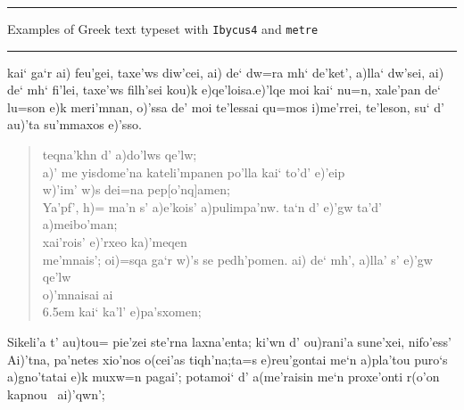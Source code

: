 \documentclass[11pt]{report}
\begin{document}
\vspace{2ex}
\hrule height 1.5pt \vspace{2ex}
{\large Examples of Greek text typeset with \texttt{Ibycus4} and %
  \texttt{metre}}
\vspace{2ex}
\hrule height 1.5pt
\vspace{7ex}
\selectfont
{\obeylines\everypar{\quad}
kai` ga`r ai) feu'gei, taxe'ws diw'cei,
ai) de` dw=ra mh` de'ket', a)lla` dw'sei,
ai) de` mh` fi'lei, taxe'ws filh'sei
kou)k e)qe'loisa.\linea* 
e)'lqe moi kai` nu=n, xale'pan de` lu=son
e)k meri'mnan, o)'ssa de' moi te'lessai
qu=mos i)me'rrei, te'leson, su` d' au)'ta
su'mmaxos e)'sso.\geminata*
}
\vspace{5ex}
\begin{verse}
teqna'khn d' a)do'lws qe'lw;\\
a)' me yisdome'na kateli'mpanen\linea
po'lla kai` to'd' e)'eip\punctum\lbrack\\
w)'im' w)s dei=na pep[o'nq]amen;\\
Ya'pf', h)= ma'n s' a)e'kois' a)pulimpa'nw.\linea
ta`n d' e)'gw ta'd' a)meibo'man;\\
xai'rois' e)'rxeo ka)'meqen\\
me'mnais'; oi)=sqa ga`r w)'s se pedh'pomen.\linea
ai) de` mh', a)lla' s' e)'gw qe'lw\\
o)'mnaisai\lbrack\punctum[3]\Punctum\rbrack%
 \lbrack\punctum[2]\Punctum\rbrack\punctum[2]ai\\
 \punctum[2]\lbrack\kern 6.5em\rbrack%
   kai` ka'l' e)pa'sxomen;\linea
\end{verse}
\vspace{5ex}
{\obeylines\everypar{\quad}
Sikeli'a t' au)tou= pie'zei
ste'rna lax\positio na'enta; ki'wn d' ou)rani'a sune'xei,
nifo'ess' Ai)'tna, pa'netes
xio'nos o(cei'as tiqh'na;\lunata*[.1]
ta=s e)reu'gontai me`n a)p\positio la'tou puro`s a)g\positio no'tatai
e)k muxw=n pagai'; potamoi`
\quad d' a(me'raisin me`n proxe'onti r(o'on kap\Positio nou~
ai)'qwn';
}
\newpage
\end{document}
